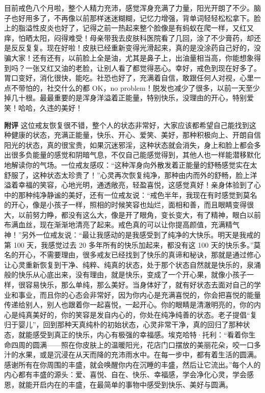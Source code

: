 \begin{case}
    目前戒色八个月啦，整个人精力充沛，感觉浑身充满了力量，阳光开朗了不少。脑子也好用多了，不再像以前那样迷迷糊糊，记忆力增强，背单词轻轻松松拿下。脸上的脂溢性皮炎也好了，记得之前一热起来整个脸像是有蚂蚁在爬一样，又红又痒，怕晒太阳，闷得难受！母亲带我去皮肤科医院看了几回，涂了不少膏药，却还是反反复复。现在好啦！皮肤已经重新变得光滑起来，真的是没涂药自己好的，没骗大家！还有还有，以前脸上全是油，尤其是鼻子上，出油量相当高，你能想象得到吗？一张又红又油的老脸，让别人看了都觉得恶心。幸好，戒色到现在好多了。胃口变好，消化很快，能吃。社恐也好了，充满着自信，敢跟任何人对视，心里一点不带怕的，社交什么的都 OK，no problem！脱发也减少了很多，以前一天至少掉几十根。最最重要的是浑身洋溢着正能量，特别快乐，没理由的开心，特别爱笑！哈哈，久违的美好！

    \textbf{附评} 这位戒友恢复很不错，整个人的状态非常好，大家应该都希望自己能找到这种健康的状态，充满正能量，快乐、开心、爱笑、美好，那种积极向上、开朗自信阳光的状态，真的很宝贵，如果沉迷邪淫，这种状态就会消失，身上和脸上都会多出很多负能量的感觉和阴暗气息，不仅自己能感觉得到，其他人也一样能潜移默化地解读你的气场。一位戒友感叹：“这种浑身向外散发着正能量的舒畅感觉实在太舒服了，这种状态太珍贵了！”心灵再次恢复纯净，那种由内而外的舒畅，脸上洋溢着幸福的笑容，心地光明，通透敞亮，轻盈喜悦，这感觉真好！亲身体验到了心中的那种纯净静谧的美好，还有一位戒友说：“戒色半年，我现在有时感觉到莫名的开心，像是小孩子一样，照相的时候笑容也灿烂，面相和善，而且眼睛变得很大，以前努力睁，都没有这么大，像是开了眼角，变长变大，有了精神，眼白以前布满血丝，现在渐渐地清亮了起来。戒色真的可以让你提高颜值，充满精气神！”另外一位戒友说：“最让我感动的是我感受到了纯净的大快乐。明天是我戒的第 100 天，我感觉过去 20 多年所有的快乐加起来，都没有这 100 天的快乐多。”莫名的开心，不需要理由，很多戒友已经找到了快乐的真谛和秘诀，那就是通过修心让心灵重新恢复到干净、纯粹、纯真的状态，处于那个状态自然就是快乐的，泉涌般的快乐从心底出来，没有理由，就是快乐，变成了一个开心果，就像小孩子一样，很容易快乐，那么单纯，那么美好。当身体好了，就有好状态去面对自己的学业和事业，而且你的心态会非常好，因为你内心是充满喜悦的，你会把喜悦的能量传递给别人，别人也跟着你一起喜悦，一起开心。你的眼睛是清澈明亮的，你的内心是纯真美好的，你的笑容是发自内心的，你处在纯净纯善的状态。老子提倡“复归于婴儿”，回到那种天真纯朴的初始状态，心灵非常干净，真的回归了那种状态，就能感受到真正的快乐，内心有极强的幸福感。埃克哈特·托利：“看着你生命四周的圆满——照在你皮肤上的温暖阳光，花店门口摆放的美丽花朵，咬一口多汁的水果，或是沉浸在从天而降的充沛雨水中。在每一步中，都有着生活的圆满。感谢所有在你周围的丰盛，就会唤醒你内在沉睡的丰盛，然后让它流出。”每个人的内心都有丰盛的源头：爱、喜悦、自在、快乐、幸福感，学会净化心灵，学会感恩，就能开启内在的丰盛，在最简单的事物中感受到快乐、美好与圆满。
\end{case}

